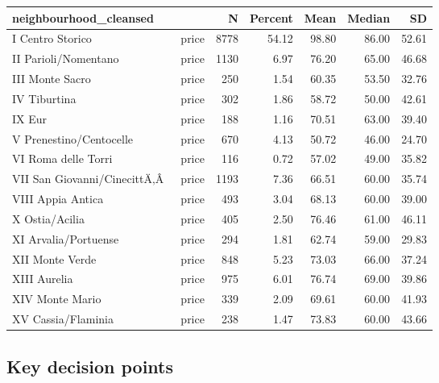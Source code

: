 \documentclass[
]{article}
\begin{document}
\begin{table}
\centering
\begin{tabular}[t]{llrrrrr}
\toprule
neighbourhood\_cleansed &   & N & Percent & Mean & Median & SD\\
\midrule
I Centro Storico & price & 8778 & \num{54.12} & \num{98.80} & \num{86.00} & \num{52.61}\\
II Parioli/Nomentano & price & 1130 & \num{6.97} & \num{76.20} & \num{65.00} & \num{46.68}\\
III Monte Sacro & price & 250 & \num{1.54} & \num{60.35} & \num{53.50} & \num{32.76}\\
IV Tiburtina & price & 302 & \num{1.86} & \num{58.72} & \num{50.00} & \num{42.61}\\
IX Eur & price & 188 & \num{1.16} & \num{70.51} & \num{63.00} & \num{39.40}\\
V Prenestino/Centocelle & price & 670 & \num{4.13} & \num{50.72} & \num{46.00} & \num{24.70}\\
VI Roma delle Torri & price & 116 & \num{0.72} & \num{57.02} & \num{49.00} & \num{35.82}\\
VII San Giovanni/CinecittÄ‚Â  & price & 1193 & \num{7.36} & \num{66.51} & \num{60.00} & \num{35.74}\\
VIII Appia Antica & price & 493 & \num{3.04} & \num{68.13} & \num{60.00} & \num{39.00}\\
X Ostia/Acilia & price & 405 & \num{2.50} & \num{76.46} & \num{61.00} & \num{46.11}\\
XI Arvalia/Portuense & price & 294 & \num{1.81} & \num{62.74} & \num{59.00} & \num{29.83}\\
XII Monte Verde & price & 848 & \num{5.23} & \num{73.03} & \num{66.00} & \num{37.24}\\
XIII Aurelia & price & 975 & \num{6.01} & \num{76.74} & \num{69.00} & \num{39.86}\\
XIV Monte Mario & price & 339 & \num{2.09} & \num{69.61} & \num{60.00} & \num{41.93}\\
XV Cassia/Flaminia & price & 238 & \num{1.47} & \num{73.83} & \num{60.00} & \num{43.66}\\
\bottomrule
\end{tabular}
\end{table}

\hypertarget{key-decision-points}{%
\subsection{Key decision points}\label{key-decision-points}}
\end{document}
